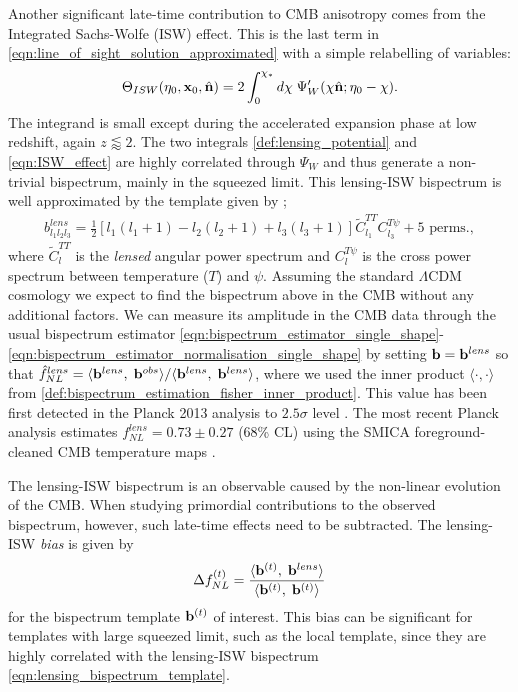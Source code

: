 Another significant late-time contribution to CMB anisotropy comes from the Integrated Sachs-Wolfe (ISW) effect. This is the last term in \eqref{eqn:line_of_sight_solution_approximated} with a simple relabelling of variables:
\begin{align}
	\Theta_{ISW}(\eta_0,\mathbf{x}_0, \hat{\mathbf{n}}) = 2\int_0^{\chi_*} d\chi \; \Psi'_W (\chi\hat{\mathbf{n}}; \eta_0-\chi). \label{eqn:ISW_effect}
\end{align}
The integrand is small except during the accelerated expansion phase at low redshift, again $z\lessapprox2$. The two integrals \eqref{def:lensing_potential} and \eqref{eqn:ISW_effect} are highly correlated through $\Psi_W$ and thus generate a non-trivial bispectrum, mainly in the squeezed limit. This lensing-ISW bispectrum is well approximated by the template given by \cite{Lewis2011lensing};
\begin{align}
	b^{lens}_{l_1 l_2 l_3} = \frac{1}{2}\left[ l_1 (l_1 + 1) - l_2 (l_2 + 1) + l_3 (l_3 + 1) \right] \tilde{C}_{l_1}^{TT} C_{l_3}^{T\psi} + \text{5 perms.}, \label{eqn:lensing_bispectrum_template}
\end{align}
where $\tilde{C}^{TT}_l$ is the \textit{lensed} angular power spectrum and $C^{T\psi}_l$ is the cross power spectrum between temperature ($T$) and $\psi$. Assuming the standard $\Lambda$CDM cosmology we expect to find the bispectrum above in the CMB without any additional factors. We can measure its amplitude in the CMB data through the usual bispectrum estimator \eqref{eqn:bispectrum_estimator_single_shape}-\eqref{eqn:bispectrum_estimator_normalisation_single_shape} by setting $\mathbf{b} = \mathbf{b}^{lens}$ so that $\hat{f}^{lens}_{NL} = \langle \mathbf{b}^{lens}, \; \mathbf{b}^{obs} \rangle / \langle \mathbf{b}^{lens}, \; \mathbf{b}^{lens} \rangle$, where we used the inner product $\langle \cdot,\cdot \rangle$ from \eqref{def:bispectrum_estimation_fisher_inner_product}. This value has been first detected in the Planck 2013 analysis to $2.5\sigma$ level \cite{PlanckCollaboration2013ISW}. The most recent Planck analysis estimates $f^{lens}_{NL} = 0.73 \pm 0.27$ (68\% CL) using the SMICA foreground-cleaned CMB temperature maps \cite{PlanckCollaboration2018}.

The lensing-ISW bispectrum is an observable caused by the non-linear evolution of the CMB. When studying primordial contributions to the observed bispectrum, however, such late-time effects need to be subtracted. The lensing-ISW \textit{bias} is given by
\begin{align}
	\Delta f_{NL}^{(t)} = \frac{ \langle \mathbf{b}^{(t)}, \; \mathbf{b}^{lens} \rangle }{ \langle \mathbf{b}^{(t)}, \; \mathbf{b}^{(t)} \rangle} \label{eqn:lensing_ISW_bias}
\end{align}
for the bispectrum template $\mathbf{b}^{(t)}$ of interest. This bias can be significant for templates with large squeezed limit, such as the local template, since they are highly correlated with the lensing-ISW bispectrum \eqref{eqn:lensing_bispectrum_template}.


